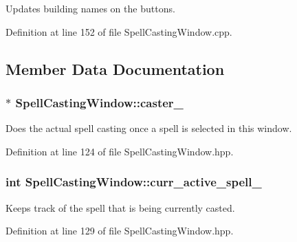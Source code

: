 Updates building names on the buttons. 



Definition at line 152 of file Spell\+Casting\+Window.\+cpp.



\subsection{Member Data Documentation}
\subsubsection[{\texorpdfstring{caster\+\_\+}{caster_}}]{$\ast$ Spell\+Casting\+Window\+::caster\+\_\+\hspace{0.3cm}{\ttfamily [private]}}\hypertarget{class_spell_casting_window_a4115e976e15588fce9cb953df23e69e5}{}\label{class_spell_casting_window_a4115e976e15588fce9cb953df23e69e5}


Does the actual spell casting once a spell is selected in this window. 



Definition at line 124 of file Spell\+Casting\+Window.\+hpp.

\subsubsection[{\texorpdfstring{curr\+\_\+active\+\_\+spell\+\_\+}{curr_active_spell_}}]{\setlength{\rightskip}{0pt plus 5cm}int Spell\+Casting\+Window\+::curr\+\_\+active\+\_\+spell\+\_\+\hspace{0.3cm}{\ttfamily [private]}}\hypertarget{class_spell_casting_window_adf1f5455827f746f5adbfb06cefc6c66}{}\label{class_spell_casting_window_adf1f5455827f746f5adbfb06cefc6c66}


Keeps track of the spell that is being currently casted. 



Definition at line 129 of file Spell\+Casting\+Window.\+hpp.

